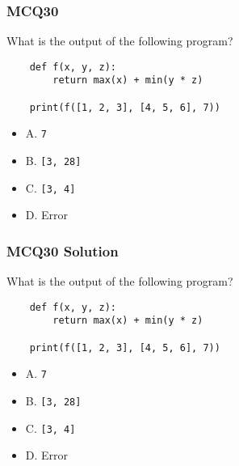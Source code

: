 \documentclass{beamer}
\begin{document}
\begin{frame}[fragile]
    \frametitle{MCQ30}
    What is the output of the following program?
    \begin{verbatim}
    def f(x, y, z):
        return max(x) + min(y * z)

    print(f([1, 2, 3], [4, 5, 6], 7))
    \end{verbatim}
    \begin{itemize}
        \item A. \texttt{7}
        \item B. \texttt{[3, 28]}
        \item C. \texttt{[3, 4]}
        \item D. Error
    \end{itemize}
\end{frame}
\begin{frame}[fragile]
    \frametitle{MCQ30 Solution}
    What is the output of the following program?
    \begin{verbatim}
    def f(x, y, z):
        return max(x) + min(y * z)

    print(f([1, 2, 3], [4, 5, 6], 7))
    \end{verbatim}
    \begin{itemize}
        \item \alert{A. \texttt{7}}
        \item B. \texttt{[3, 28]}
        \item C. \texttt{[3, 4]}
        \item D. Error
    \end{itemize}
\end{frame}
\end{document}
